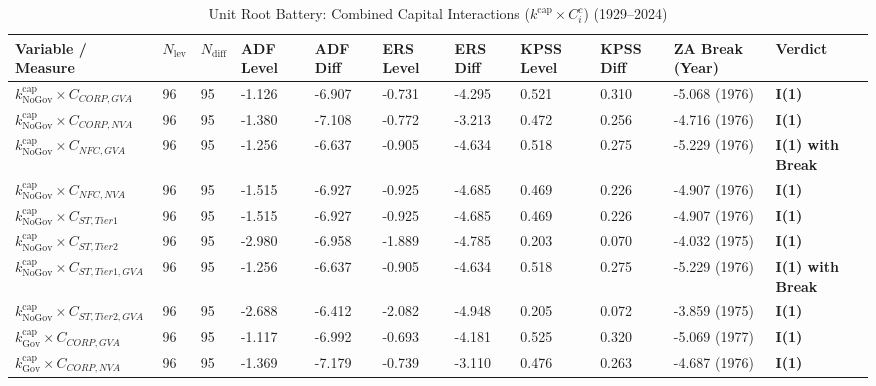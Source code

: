 \begin{table}[H]
\centering
\scriptsize
\caption{Unit Root Battery: Combined Capital Interactions ($k^{\text{cap}} \times C_i^c$) (1929--2024)}
\label{tab:urca_interactions}
\begin{tabular}{p{5.5cm} p{0.5cm} p{0.5cm} p{1.3cm} p{1.3cm} p{1.3cm} p{1.3cm} p{1.3cm} p{1.3cm} p{2.2cm} p{2.2cm}}
\toprule
\textbf{Variable / Measure} & \textbf{$N_{\text{lev}}$} & \textbf{$N_{\text{diff}}$} & \textbf{ADF Level} & \textbf{ADF Diff} & \textbf{ERS Level} & \textbf{ERS Diff} & \textbf{KPSS Level} & \textbf{KPSS Diff} & \textbf{ZA Break (Year)} & \textbf{Verdict} \\
\midrule
$k^{\text{cap}}_{\text{NoGov}} \times C_{CORP,GVA}$ & 96 & 95 & -1.126 & -6.907 & -0.731 & -4.295 & 0.521 & 0.310 & -5.068 (1976) & \textbf{I(1)} \\ 
$k^{\text{cap}}_{\text{NoGov}} \times C_{CORP,NVA}$ & 96 & 95 & -1.380 & -7.108 & -0.772 & -3.213 & 0.472 & 0.256 & -4.716 (1976) & \textbf{I(1)} \\ 
$k^{\text{cap}}_{\text{NoGov}} \times C_{NFC,GVA}$ & 96 & 95 & -1.256 & -6.637 & -0.905 & -4.634 & 0.518 & 0.275 & -5.229 (1976) & \textbf{I(1) with Break} \\ 
$k^{\text{cap}}_{\text{NoGov}} \times C_{NFC,NVA}$ & 96 & 95 & -1.515 & -6.927 & -0.925 & -4.685 & 0.469 & 0.226 & -4.907 (1976) & \textbf{I(1)} \\ 
$k^{\text{cap}}_{\text{NoGov}} \times C_{ST,Tier1}$ & 96 & 95 & -1.515 & -6.927 & -0.925 & -4.685 & 0.469 & 0.226 & -4.907 (1976) & \textbf{I(1)} \\ 
$k^{\text{cap}}_{\text{NoGov}} \times C_{ST,Tier2}$ & 96 & 95 & -2.980 & -6.958 & -1.889 & -4.785 & 0.203 & 0.070 & -4.032 (1975) & \textbf{I(1)} \\ 
$k^{\text{cap}}_{\text{NoGov}} \times C_{ST,Tier1,GVA}$ & 96 & 95 & -1.256 & -6.637 & -0.905 & -4.634 & 0.518 & 0.275 & -5.229 (1976) & \textbf{I(1) with Break} \\ 
$k^{\text{cap}}_{\text{NoGov}} \times C_{ST,Tier2,GVA}$ & 96 & 95 & -2.688 & -6.412 & -2.082 & -4.948 & 0.205 & 0.072 & -3.859 (1975) & \textbf{I(1)} \\ 
$k^{\text{cap}}_{\text{Gov}} \times C_{CORP,GVA}$ & 96 & 95 & -1.117 & -6.992 & -0.693 & -4.181 & 0.525 & 0.320 & -5.069 (1977) & \textbf{I(1)} \\ 
$k^{\text{cap}}_{\text{Gov}} \times C_{CORP,NVA}$ & 96 & 95 & -1.369 & -7.179 & -0.739 & -3.110 & 0.476 & 0.263 & -4.687 (1976) & \textbf{I(1)} \\ 

\end{tabular}
\end{table}
